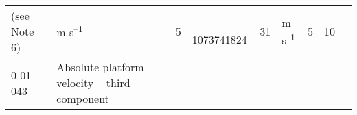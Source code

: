 \begin{longtable}[]{@{}lllllllll@{}}
\begin{minipage}[t]{0.08\columnwidth}
(see Note 6)\strut
\end{minipage} & \begin{minipage}[t]{0.08\columnwidth}\raggedright
m s\textsuperscript{--1}\strut
\end{minipage} & \begin{minipage}[t]{0.08\columnwidth}\raggedright
5\strut
\end{minipage} & \begin{minipage}[t]{0.08\columnwidth}\raggedright
--1073741824\strut
\end{minipage} & \begin{minipage}[t]{0.08\columnwidth}\raggedright
31\strut
\end{minipage} & \begin{minipage}[t]{0.08\columnwidth}\raggedright
m s\textsuperscript{--1}\strut
\end{minipage} & \begin{minipage}[t]{0.08\columnwidth}\raggedright
5\strut
\end{minipage} & \begin{minipage}[t]{0.08\columnwidth}\raggedright
10\strut
\end{minipage}\tabularnewline
\begin{minipage}[t]{0.08\columnwidth}\raggedright
0 01 043\strut
\end{minipage} & \begin{minipage}[t]{0.08\columnwidth}\raggedright
Absolute platform velocity -- third component


\end{minipage}
\end{longtable}
